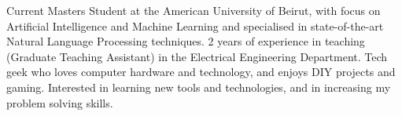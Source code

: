 

\begin{cvparagraph}

Current Masters Student at the American University of Beirut, with focus on Artificial Intelligence and Machine Learning and specialised in state-of-the-art Natural Language Processing techniques. 2 years of experience in teaching (Graduate Teaching Assistant) in the Electrical Engineering Department. Tech geek who loves computer hardware and technology, and enjoys DIY projects and gaming. Interested in learning new tools and technologies, and in increasing my problem solving skills.
\end{cvparagraph}

